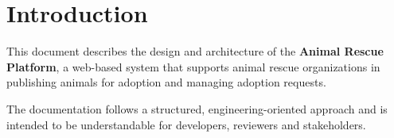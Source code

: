 \section{Introduction}

This document describes the design and architecture of the \textbf{Animal Rescue Platform},
a web-based system that supports animal rescue organizations in publishing animals for adoption
and managing adoption requests.

The documentation follows a structured, engineering-oriented approach and is intended
to be understandable for developers, reviewers and stakeholders.
